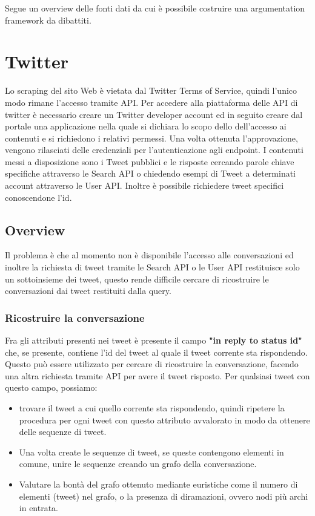 

Segue un overview delle fonti dati da cui è possibile costruire una argumentation framework da dibattiti.

\section {Twitter} %

Lo scraping del sito Web è vietata dal Twitter Terms of Service, quindi l'unico modo rimane l'accesso tramite API. Per accedere alla piattaforma delle API di twitter è necessario creare un Twitter developer account ed in seguito creare dal portale una applicazione nella quale si dichiara lo scopo dello dell'accesso ai contenuti e si richiedono i relativi permessi. Una volta ottenuta l'approvazione, vengono rilasciati delle credenziali per l'autenticazione agli endpoint. I contenuti messi a disposizione sono i Tweet pubblici e le risposte cercando parole chiave specifiche attraverso le Search API o chiedendo esempi di Tweet a determinati account attraverso le User API. Inoltre è possibile richiedere tweet specifici conoscendone l'id.

\subsection {Overview}

Il problema è che al momento non è disponibile l'accesso alle conversazioni ed inoltre la richiesta di tweet tramite le Search API o le User API restituisce solo un sottoinsieme dei tweet, questo rende difficile cercare di ricostruire le conversazioni dai tweet restituiti dalla query.

\subsubsection {Ricostruire la conversazione} 
\label{ricostruire-conv}
Fra gli attributi presenti nei tweet è presente il campo \textbf{"in reply to status id"} che, se presente, contiene l'id del tweet al quale il tweet corrente sta rispondendo. Questo può essere utilizzato per cercare di ricostruire la conversazione, facendo una altra richiesta tramite API per avere il tweet risposto. Per qualsiasi tweet con questo campo, possiamo:
\begin{itemize}
    \item trovare il tweet a cui quello corrente sta rispondendo, quindi ripetere la procedura per ogni tweet con questo attributo avvalorato in modo da ottenere delle sequenze di tweet.
    \item Una volta create le sequenze di tweet, se queste contengono elementi in comune, unire le sequenze creando un grafo della conversazione.
    \item Valutare la bontà del grafo ottenuto mediante euristiche come il numero di elementi (tweet) nel grafo, o la presenza di diramazioni, ovvero nodi più archi in entrata.
\end{itemize}

